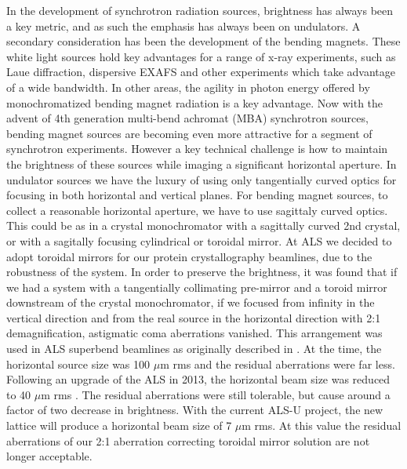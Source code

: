 \documentclass{iucr}              %
\begin{document}
In the development of synchrotron radiation sources, brightness has always been a key metric, and as such the emphasis has always been on undulators.  A secondary consideration has been the development of the bending magnets. These white light sources hold key advantages for a range of x-ray experiments, such as Laue diffraction, dispersive EXAFS and other experiments which take advantage of a wide bandwidth.  In other areas, the agility in photon energy offered by monochromatized bending magnet radiation is a key advantage.  Now with the advent of 4th generation multi-bend achromat (MBA) synchrotron sources, bending magnet sources are becoming even more attractive for a segment of synchrotron experiments.  However a key technical challenge is how to maintain the brightness of these sources while imaging a significant horizontal aperture.  In undulator sources we have the luxury of using only tangentially curved optics for focusing in both horizontal and vertical planes.  For bending magnet sources, to collect a reasonable horizontal aperture, we have to use sagittaly curved optics.  This could be as in a crystal monochromator with a sagittally curved 2nd crystal, or with a sagitally focusing cylindrical or toroidal mirror.  At ALS we decided to adopt toroidal mirrors for our protein crystallography beamlines, due to the robustness of the system.  In order to preserve the brightness, it was found that if we had a system with a tangentially collimating pre-mirror and a toroid mirror downstream of the crystal monochromator, if we focused from infinity in the vertical direction and from the real source in the horizontal direction with 2:1 demagnification,  astigmatic coma aberrations vanished. This arrangement was used in ALS superbend beamlines as originally described in  \cite{MacDowell2004}.
At the time, the horizontal source size was 100 $\mu$m rms and the residual aberrations were far less.  Following an upgrade of the ALS in 2013, the horizontal beam size was reduced to 40 $\mu$m  rms \cite{Steier_2014}. The residual aberrations were still tolerable, but cause around a factor of two decrease in brightness.  With the current ALS-U project, the new lattice will produce a horizontal beam size of 7 $\mu$m rms.  At this value the residual aberrations of our 2:1 aberration correcting toroidal mirror solution are not longer acceptable.
\end{document}
